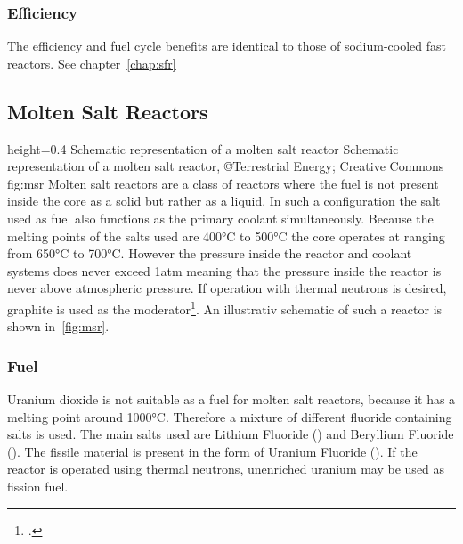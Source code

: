 \subsubsection{Efficiency}
The efficiency and fuel cycle benefits are identical to those of sodium-cooled fast reactors. See chapter~\ref{chap:sfr}
\pagebreak
\subsection{Molten Salt Reactors}
    {height=0.4\textheight}
    {Schematic representation of a molten salt reactor}
    {Schematic representation of a molten salt reactor, ©Terrestrial Energy; Creative Commons}
    {fig:msr}
Molten salt reactors are a class of reactors where the fuel is not present inside the core as a solid
but rather as a liquid. In such a configuration the salt used as fuel also functions as the primary coolant
simultaneously. Because the melting points of the salts used are 400°C to 500°C the core operates at
ranging from 650°C to 700°C. However the pressure inside the reactor and coolant systems does never
exceed 1atm meaning that the pressure inside the reactor is never above atmospheric pressure.
If operation with thermal neutrons is desired, graphite is used as the moderator\footcite[147-152]{T4Gen}.
An illustrativ schematic of such a reactor is shown in~\ref{fig:msr}.
\subsubsection{Fuel}
Uranium dioxide is not suitable as a fuel for molten salt reactors, because it has a melting point around
1000°C. Therefore a mixture of different fluoride containing salts is used. The main salts used are
Lithium Fluoride () and Beryllium Fluoride (). The fissile material is present in the
form of Uranium Fluoride (). If the reactor is operated using thermal neutrons, unenriched
uranium may be used as fission fuel.
